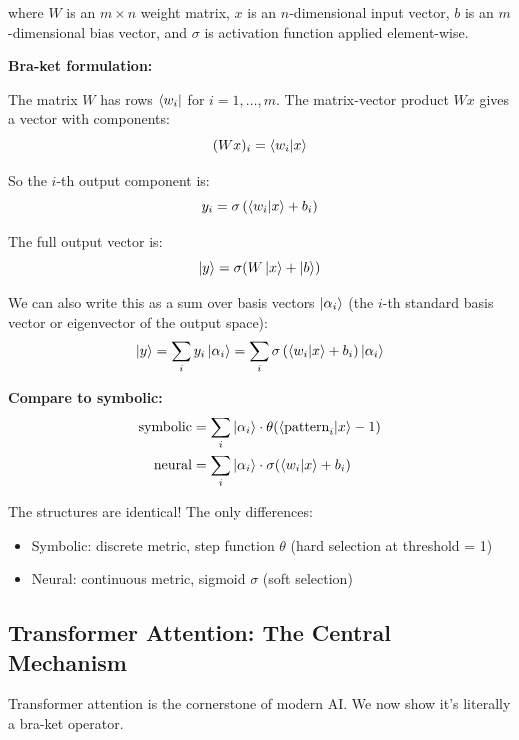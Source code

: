 \documentclass[11pt,a4paper]{article}
\theoremstyle{definition}
\begin{document}
where $W$ is an $m \times n$ weight matrix, $x$ is an $n$-dimensional input vector, $b$ is an $m$-dimensional bias vector, and $\sigma$ is activation function applied element-wise.

\textbf{Bra-ket formulation:}

The matrix $W$ has rows $\bra{w_i}$ for $i = 1, \ldots, m$. The matrix-vector product $Wx$ gives a vector with components:
\begin{equation}
(Wx)_i = \braket{w_i|x}
\end{equation}

So the $i$-th output component is:
\begin{equation}
y_i = \sigma\left(\braket{w_i|x} + b_i\right)
\end{equation}

The full output vector is:
\begin{equation}
\ket{y} = \sigma(W\ket{x} + \ket{b})
\end{equation}

We can also write this as a sum over basis vectors $\ket{\alpha_i}$ (the $i$-th standard basis vector or eigenvector of the output space):
\begin{equation}
\ket{y} = \sum_i y_i \ket{\alpha_i} = \sum_i \sigma\left(\braket{w_i|x} + b_i\right) \ket{\alpha_i}
\end{equation}

\textbf{Compare to symbolic:}
\begin{align}
\text{symbolic} &= \sum_i \ket{\alpha_i} \cdot \theta(\braket{\text{pattern}_i|x} - 1) \\
\text{neural} &= \sum_i \ket{\alpha_i} \cdot \sigma(\braket{w_i|x} + b_i)
\end{align}

The structures are identical! The only differences:
\begin{itemize}
\item Symbolic: discrete metric, step function $\theta$ (hard selection at threshold = 1)
\item Neural: continuous metric, sigmoid $\sigma$ (soft selection)
\end{itemize}

\subsection{Transformer Attention: The Central Mechanism}

Transformer attention is the cornerstone of modern AI. We now show it's literally a bra-ket operator.
\end{document}
